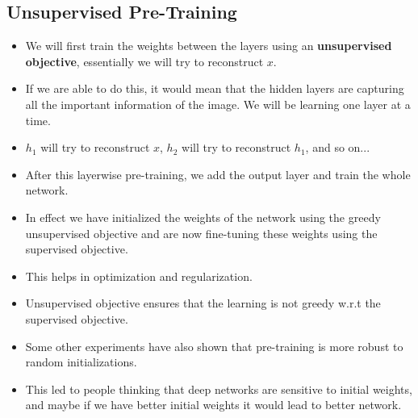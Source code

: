 \documentclass[a4paper]{article}
\begin{document}
\subsection{Unsupervised Pre-Training}
\begin{itemize}
    \item We will first train the weights between the layers using an \textbf{unsupervised objective}, essentially we will try to reconstruct $x$.
    \item If we are able to do this, it would mean that the hidden layers are capturing all the important information of the image. We will be learning one layer at a time.
    \item $h_1$ will try to reconstruct $x$, $h_2$ will try to reconstruct $h_1$, and so on...
    \item After this layerwise pre-training, we add the output layer and train the whole network.
    \item In effect we have initialized the weights of the network using the greedy unsupervised objective and are now fine-tuning these weights using the supervised objective.
    \item This helps in optimization and regularization.
    \item Unsupervised objective ensures that the learning is not greedy w.r.t the supervised objective.
    \item Some other experiments have also shown that pre-training is more robust to random initializations.
    \item This led to people thinking that deep networks are sensitive to initial weights, and maybe if we have better initial weights it would lead to better network.
\end{itemize}
\end{document}
